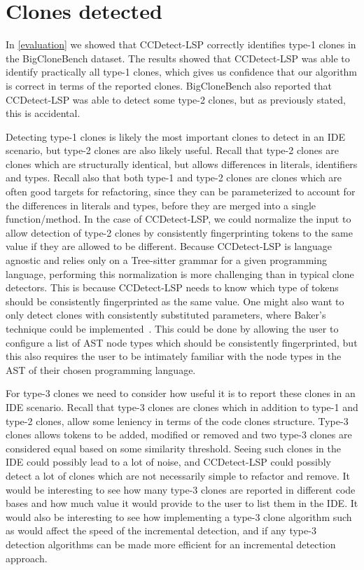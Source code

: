 \section{Clones detected}

In \cref{evaluation} we showed that CCDetect-LSP correctly identifies type-1 clones in the
BigCloneBench dataset. The results showed that CCDetect-LSP was able to identify
practically all type-1 clones, which gives us confidence that our algorithm is correct in
terms of the reported clones. BigCloneBench also reported that CCDetect-LSP was able to
detect some type-2 clones, but as previously stated, this is accidental.

Detecting type-1 clones is likely the most important clones to detect in an IDE scenario,
but type-2 clones are also likely useful. Recall that type-2 clones are clones which are
structurally identical, but allows differences in literals, identifiers and types. Recall
also that both type-1 and type-2 clones are clones which are often good targets for
refactoring, since they can be parameterized to account for the differences in literals
and types, before they are merged into a single function/method. In the case of
CCDetect-LSP, we could normalize the input to allow detection of type-2 clones by
consistently fingerprinting tokens to the same value if they are allowed to be different.
Because CCDetect-LSP is language agnostic and relies only on a Tree-sitter grammar for a
given programming language, performing this normalization is more challenging than in
typical clone detectors. This is because CCDetect-LSP needs to know which type of tokens
should be consistently fingerprinted as the same value. One might also want to only detect
clones with consistently substituted parameters, where Baker's technique could be
implemented~\cite{Bakerdup}. This could be done by allowing the user to configure a list
of AST node types which should be consistently fingerprinted, but this also requires the
user to be intimately familiar with the node types in the AST of their chosen programming
language.

For type-3 clones we need to consider how useful it is to report these clones in an IDE
scenario. Recall that type-3 clones are clones which in addition to type-1 and type-2
clones, allow some leniency in terms of the code clones structure. Type-3 clones allows
tokens to be added, modified or removed and two type-3 clones are considered equal based
on some similarity threshold. Seeing such clones in the IDE could possibly lead to a lot
of noise, and CCDetect-LSP could possibly detect a lot of clones which are not necessarily
simple to refactor and remove. It would be interesting to see how many type-3 clones are
reported in different code bases and how much value it would provide to the user to list
them in the IDE. It would also be interesting to see how implementing a type-3 clone
algorithm such as \cite{BakerLCS} would affect the speed of the incremental detection, and
if any type-3 detection algorithms can be made more efficient for an incremental detection
approach.
